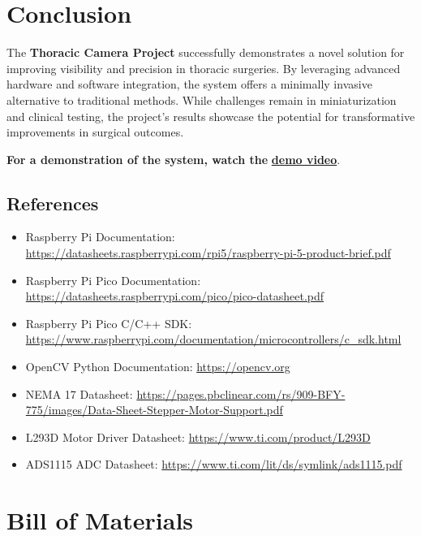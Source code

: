 \section{Conclusion}
The \textbf{Thoracic Camera Project} successfully demonstrates a novel solution for improving visibility and precision in thoracic surgeries. By leveraging advanced hardware and software integration, the system offers a minimally invasive alternative to traditional methods. While challenges remain in miniaturization and clinical testing, the project's results showcase the potential for transformative improvements in surgical outcomes.

\vspace{0.5cm}
\noindent
\textbf{\normalsize For a demonstration of the system, watch the} \href{https://youtu.be/UekYdXSXzXo}{\textbf{\normalsize demo video}}.
\vspace{0.5cm}



\subsection{References}
\begin{itemize}
    \item Raspberry Pi Documentation: \url{https://datasheets.raspberrypi.com/rpi5/raspberry-pi-5-product-brief.pdf}
    \item Raspberry Pi Pico Documentation: \url{https://datasheets.raspberrypi.com/pico/pico-datasheet.pdf}
    \item Raspberry Pi Pico C/C++ SDK: \url{https://www.raspberrypi.com/documentation/microcontrollers/c_sdk.html}
    \item OpenCV Python Documentation: \url{https://opencv.org}
    \item NEMA 17 Datasheet: \url{https://pages.pbclinear.com/rs/909-BFY-775/images/Data-Sheet-Stepper-Motor-Support.pdf}
    \item L293D Motor Driver Datasheet: \url{https://www.ti.com/product/L293D}
    \item ADS1115 ADC Datasheet: \url{https://www.ti.com/lit/ds/symlink/ads1115.pdf}
\end{itemize}

\section{Bill of Materials}

